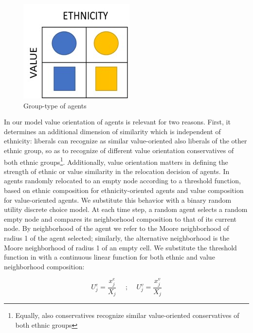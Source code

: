 \documentclass[
]{article}
\begin{document}
\begin{figure}[h]

{\centering \includegraphics[width=0.7\linewidth]{model} 

}

\caption{Group-type of agents}\label{fig:model}
\end{figure}

In our model value orientation of agents is relevant for two reasons.
First, it determines an additional dimension of similarity which is
independent of ethnicity: liberals can recognize as similar
value-oriented also liberals of the other ethnic group, so as to
recognize of different value orientation conservatives of both ethnic
groups\footnote{Equally, also conservatives recognize similar value-oriented conservatives of both ethnic groups}.
Additionally, value orientation matters in defining the strength of
ethnic or value similarity in the relocation decision of agents. In
\cite{paolillo2018} agents randomly relocated to an empty node according
to a threshold function, based on ethnic composition for
ethnicity-oriented agents and value composition for value-oriented
agents. We substitute this behavior with a binary random utility
discrete choice model. At each time step, a random agent selects a
random empty node and compares its neighborhood composition to that of
its current node. By neighborhood of the agent we refer to the Moore
neighborhood of radius 1 of the agent selected; similarly, the
alternative neighborhood is the Moore neighborhood of radius 1 of an
empty cell. We substitute the threshold function in \cite{paolillo2018}
with a continuous linear function for both ethnic and value neighborhood
composition:

\begin{equation}
   U^e_j = \frac{x^e_j}{X_j}\quad\text{   ;    }\quad  U^v_j = \frac{x^v_j}{X_j}
\end{equation}
\end{document}
